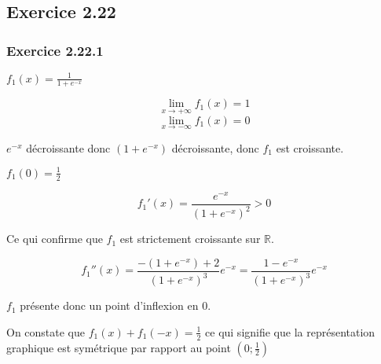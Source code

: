 \documentclass[a4paper,10pt]{report}
\begin{document}

\subsection*{Exercice 2.22}

\subsubsection*{Exercice 2.22.1}

$f_1(x) = \frac{1}{1+e^{-x}}$

\begin{displaymath}
	\lim_{x \rightarrow +\infty} f_1(x) = 1
\end{displaymath}
\begin{displaymath}
	\lim_{x \rightarrow -\infty} f_1(x) = 0
\end{displaymath}

$e^{-x}$ décroissante donc $(1+e^{-x})$ décroissante, donc $f_1$ est croissante.

$f_1(0) = \frac{1}{2}$

\begin{displaymath}
	f_1'(x) = \frac{e^{-x}}{(1+e^{-x})^2} > 0
\end{displaymath}

Ce qui confirme que $f_1$ est strictement croissante sur $\mathbb{R}$.

\begin{displaymath}
	f_1''(x) = \frac{-(1+e^{-x})+2}{(1+e^{-x})^3}e^{-x}
	         = \frac{1-e^{-x}}{(1+e^{-x})^3}e^{-x}
\end{displaymath}

$f_1$ présente donc un point d'inflexion en $0$.

On constate que $f_1(x) + f_1(-x) = \frac{1}{2}$ ce qui signifie que la représentation
graphique est symétrique par rapport au point $(0 ; \frac{1}{2})$


\end{document}
